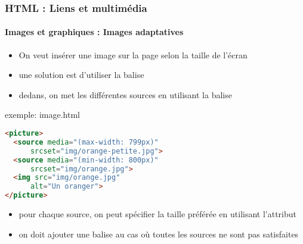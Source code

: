 \documentclass[xcolor=table]{beamer}
\begin{document}
\begin{frame}[fragile]
\frametitle{HTML : Liens et multimédia}
\framesubtitle{Images et graphiques : Images adaptatives}

\begin{minipage}{0.50\textwidth} 
	\begin{itemize}
		\item On veut insérer une image sur la page selon la taille de l'écran
		\item une solution est d'utiliser la balise 
		\item dedans, on met les différentes sources en utilisant la balise 
	\end{itemize}
\end{minipage}
%
\begin{minipage}{0.49\textwidth}
\begin{exampleblock}{exemple: image.html}
\lstset{escapeinside=**}
\scriptsize\bfseries\vspace{-6pt}
\begin{lstlisting}[language={html}]
<picture>
  <source media="(max-width: 799px)" 
      srcset="img/orange-petite.jpg">
  <source media="(min-width: 800px)" 
      srcset="img/orange.jpg">
  <img src="img/orange.jpg" 
      alt="Un oranger">
</picture>
\end{lstlisting}\vspace{-6pt}
\end{exampleblock}
\end{minipage}

\begin{itemize}
	\item pour chaque source, on peut spécifier la taille préférée en utilisant l'attribut 
	\item on doit ajouter une balise  au cas où toutes les sources ne sont pas satisfaites
\end{itemize}

\end{frame}
\end{document}
